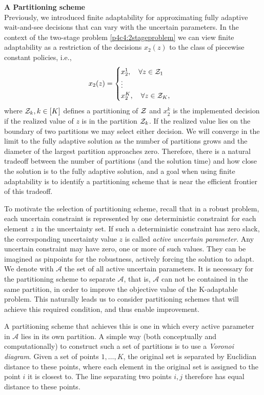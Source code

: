 \textbf{A Partitioning scheme}\\

Previously, we introduced finite adaptability for approximating fully adaptive wait-and-see decisions that can vary with the uncertain parameters. In the context of the two-stage problem \eqref{p4c4:2stageproblem} we can view finite adaptability as a restriction of the decisions $x_2(z)$ to the class of piecewise constant policies, i.e.,
\begin{equation}
x_2(z) = \begin{cases} x_2^1,\quad\forall z\in\mathcal{Z}_1 \\
										\vdots \\
										x_2^K,\quad\forall z\in\mathcal{Z}_K, \end{cases}
\end{equation}
where $\mathcal{Z}_k, k\in [K]$ defines a partitioning of $\mathcal{Z}$ and $x_2^k$ is the implemented decision if the realized value of $z$ is in the partition $\mathcal{Z}_k$. If the realized value lies on the boundary of two partitions we may select either decision. We will converge in the limit to the fully adaptive solution as the number of partitions grows and the diameter of the largest partition approaches zero. Therefore, there is a natural tradeoff  between the number of partitions (and the solution time) and how close the solution is to the fully adaptive solution, and a goal when using finite adaptability is to identify a partitioning scheme that is near the efficient frontier of this tradeoff.

To motivate the selection of partitioning scheme, recall that in a robust problem, each uncertain constraint is represented by one deterministic constraint for each element $z$ in the uncertainty set. If such a deterministic constraint has zero slack, the corresponding uncertainty value $z$ is called \textit{active uncertain parameter}. Any uncertain constraint may have zero, one or more of such values. They can be imagined as pinpoints for the robustness, actively forcing the solution to adapt. We denote with $\mathcal{A}$ the set of all active uncertain parameters. It is necessary for the partitioning scheme to separate $\mathcal{A}$, that is, $\mathcal{A}$ can not be contained in the same partition, in order to improve the objective value of the K-adaptable problem. This naturally leads us to consider partitioning schemes that will achieve this required condition, and thus enable improvement.

 A partitioning scheme that achieves this is one in which every active parameter  in $\mathcal{A}$ lies in its own partition. A simple way (both conceptually and computationally) to construct such a set of partitions is to use a \textit{Voronoi diagram}. Given a set of points $1,\dots,K$, the original set is separated by Euclidian distance to these points, where each element in the original set is assigned to the point $i$ it is closest to. The line separating two points $i,j$ therefore has equal distance to these points.\\

